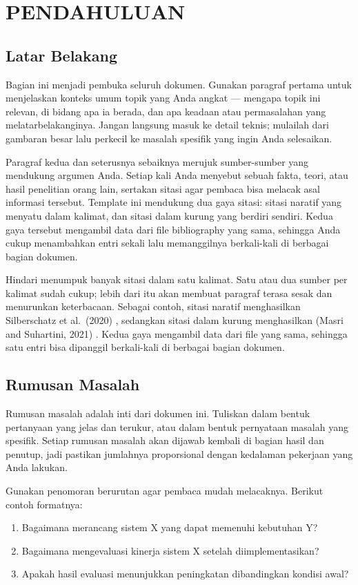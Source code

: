 \chapter{PENDAHULUAN}

\section{Latar Belakang}
Bagian ini menjadi pembuka seluruh dokumen. Gunakan paragraf pertama untuk menjelaskan konteks umum topik yang Anda angkat — mengapa topik ini relevan, di bidang apa ia berada, dan apa keadaan atau permasalahan yang melatarbelakanginya. Jangan langsung masuk ke detail teknis; mulailah dari gambaran besar lalu perkecil ke masalah spesifik yang ingin Anda selesaikan.

Paragraf kedua dan seterusnya sebaiknya merujuk sumber-sumber yang mendukung argumen Anda. Setiap kali Anda menyebut sebuah fakta, teori, atau hasil penelitian orang lain, sertakan sitasi agar pembaca bisa melacak asal informasi tersebut. Template ini mendukung dua gaya sitasi: sitasi naratif yang menyatu dalam kalimat, dan sitasi dalam kurung yang berdiri sendiri. Kedua gaya tersebut mengambil data dari file bibliography yang sama, sehingga Anda cukup menambahkan entri sekali lalu memanggilnya berkali-kali di berbagai bagian dokumen.

Hindari menumpuk banyak sitasi dalam satu kalimat. Satu atau dua sumber per kalimat sudah cukup; lebih dari itu akan membuat paragraf terasa sesak dan menurunkan keterbacaan. Sebagai contoh, sitasi naratif menghasilkan Silberschatz et al.\ (2020) \textcite{silberschatz2020}, sedangkan sitasi dalam kurung menghasilkan (Masri and Suhartini, 2021) \parencite{masri2021}. Kedua gaya mengambil data dari file yang sama, sehingga satu entri bisa dipanggil berkali-kali di berbagai bagian dokumen.

\section{Rumusan Masalah}
Rumusan masalah adalah inti dari dokumen ini. Tuliskan dalam bentuk pertanyaan yang jelas dan terukur, atau dalam bentuk pernyataan masalah yang spesifik. Setiap rumusan masalah akan dijawab kembali di bagian hasil dan penutup, jadi pastikan jumlahnya proporsional dengan kedalaman pekerjaan yang Anda lakukan.

Gunakan penomoran berurutan agar pembaca mudah melacaknya. Berikut contoh formatnya:

\begin{enumerate}
    \item Bagaimana merancang sistem X yang dapat memenuhi kebutuhan Y?
    \item Bagaimana mengevaluasi kinerja sistem X setelah diimplementasikan?
    \item Apakah hasil evaluasi menunjukkan peningkatan dibandingkan kondisi awal?
\end{enumerate}


